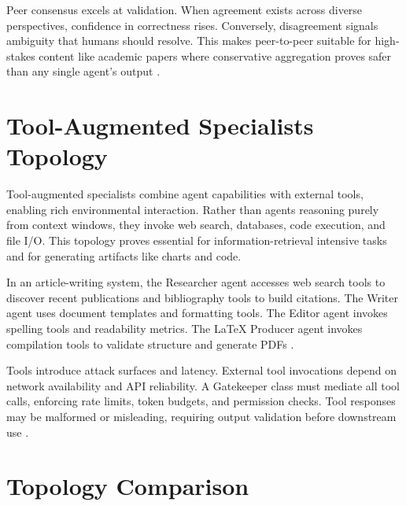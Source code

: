 Peer consensus excels at validation. When agreement exists across diverse perspectives, confidence in correctness rises. Conversely, disagreement signals ambiguity that humans should resolve. This makes peer-to-peer suitable for high-stakes content like academic papers where conservative aggregation proves safer than any single agent's output \cite{Wooldridge2009}.

\section{Tool-Augmented Specialists Topology}

Tool-augmented specialists combine agent capabilities with external tools, enabling rich environmental interaction. Rather than agents reasoning purely from context windows, they invoke web search, databases, code execution, and file I/O. This topology proves essential for information-retrieval intensive tasks and for generating artifacts like charts and code.

In an article-writing system, the Researcher agent accesses web search tools to discover recent publications and bibliography tools to build citations. The Writer agent uses document templates and formatting tools. The Editor agent invokes spelling tools and readability metrics. The LaTeX Producer agent invokes compilation tools to validate structure and generate PDFs \cite{CrewAI2024}.

Tools introduce attack surfaces and latency. External tool invocations depend on network availability and API reliability. A Gatekeeper class must mediate all tool calls, enforcing rate limits, token budgets, and permission checks. Tool responses may be malformed or misleading, requiring output validation before downstream use \cite{Segal2026}.

\section{Topology Comparison}


